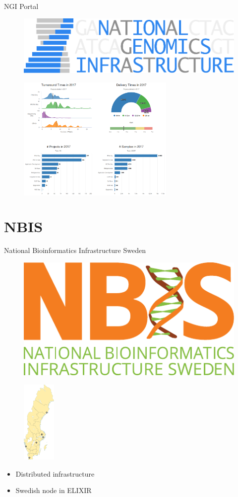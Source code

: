 \documentclass{beamer}
\begin{document}
\begin{frame}{NGI Portal}
	\begin{figure}
		\includegraphics[height=.7cm]{pictures/NGI}
	\end{figure}
	\begin{figure}
		\includegraphics[height=6cm]{pictures/NGI-Portal.png}
	\end{figure}
\end{frame}

\section{NBIS}

\begin{frame}{National Bioinformatics Infrastructure Sweden}
	\begin{figure}
		\includegraphics[height=.7cm]{pictures/NBIS}
	\end{figure}
	\begin{figure}
		\includegraphics[height=4cm]{pictures/Sweden-map-NBIS.png}
	\end{figure}
	\begin{itemize}
		\item Distributed infrastructure
		\item Swedish node in ELIXIR
	\end{itemize}
\end{frame}
\end{document}
